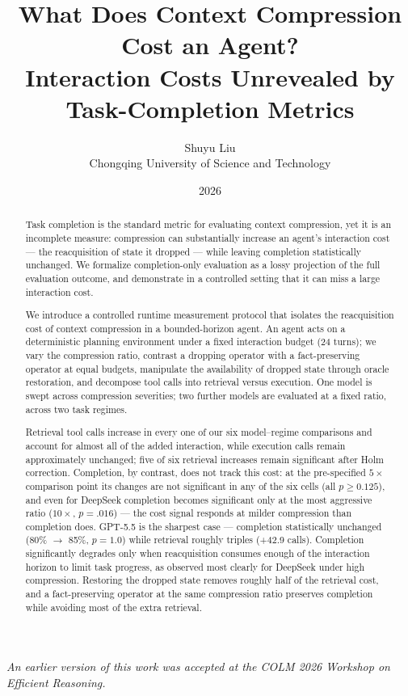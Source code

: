 \documentclass[11pt]{article}
\title{\bfseries What Does Context Compression Cost an Agent?\\[2pt]
       \large Interaction Costs Unrevealed by Task-Completion Metrics}
\author{%
  Shuyu Liu\\
  \normalsize Chongqing University of Science and Technology%
}
\date{2026}
\begin{document}
\maketitle

\begin{center}
\footnotesize
\textit{An earlier version of this work was accepted at the COLM 2026 Workshop on Efficient Reasoning.}
\end{center}

\begin{abstract}
\noindent
Task completion is the standard metric for evaluating context compression, yet it is an
incomplete measure: compression can substantially increase an agent's interaction cost ---
the reacquisition of state it dropped --- while leaving completion statistically unchanged.
We formalize completion-only evaluation as a lossy projection of the full evaluation
outcome, and demonstrate in a controlled setting that it can miss a large interaction
cost.

We introduce a controlled runtime measurement protocol that isolates the reacquisition
cost of context compression in a bounded-horizon agent. An agent acts on a deterministic
planning environment under a fixed interaction budget (24 turns); we vary the compression
ratio, contrast a dropping operator with a fact-preserving operator at equal budgets,
manipulate the availability of dropped state through oracle restoration, and decompose
tool calls into retrieval versus execution. One model is swept across compression
severities; two further models are evaluated at a fixed ratio, across two task regimes.

Retrieval tool calls increase in every one of our six model--regime comparisons and
account for almost all of the added interaction, while execution calls remain
approximately unchanged; five of six retrieval increases remain significant after Holm
correction. Completion, by contrast, does not track this cost: at the pre-specified $5\times$
comparison point its changes are not significant in any of the six cells (all $p \ge 0.125$),
and even for DeepSeek completion becomes significant only at the most aggressive ratio
($10\times$, $p = .016$) --- the cost signal responds at milder compression than completion does.
GPT-5.5 is the sharpest case ---
completion statistically unchanged (80\% $\to$ 85\%, $p = 1.0$) while retrieval roughly triples
(+42.9 calls). Completion significantly degrades only when reacquisition consumes enough
of the interaction horizon to limit task progress, as observed most clearly for DeepSeek
under high compression. Restoring the dropped state removes roughly half of the retrieval cost,
and a fact-preserving operator at the same compression ratio preserves completion while
avoiding most of the extra retrieval.


\end{abstract}
\end{document}
